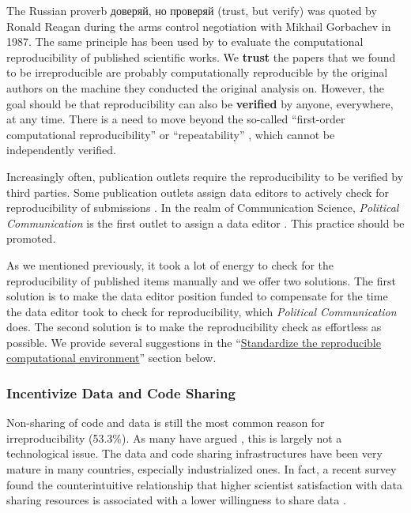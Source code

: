 The Russian proverb доверяй, но проверяй (trust, but verify) was quoted by Ronald Reagan during the arms control negotiation with Mikhail Gorbachev in 1987. The same principle has been used by \textcite{willis:2020:TV} to evaluate the computational reproducibility of published scientific works. We \textbf{trust} the papers that we found to be irreproducible are probably computationally reproducible by the original authors on the machine they conducted the original analysis on. However, the goal should be that reproducibility can also be \textbf{verified} by anyone, everywhere, at any time. There is a need to move beyond the so-called ``first-order computational reproducibility'' \parencite{schoch:2023:CRC} or ``repeatability'' \parencite{mcarthur:2019:RRR}, which cannot be independently verified.

Increasingly often, publication outlets require the reproducibility to be verified by third parties. Some publication outlets assign data editors to actively check for reproducibility of submissions \parencite[]{vilhuber2023reproducibility}. In the realm of Communication Science, \textit{Political Communication} is the first outlet to assign a data editor \parencite[]{lawrence:2022:EN}. This practice should be promoted.

As we mentioned previously, it took a lot of energy to check for the reproducibility of published items manually and we offer two solutions. The first solution is to make the data editor position funded to compensate for the time the data editor took to check for reproducibility, which \textit{Political Communication} does. The second solution is to make the reproducibility check as effortless as possible. We provide several suggestions in the ``\hyperref[subsubsec:compenviron]{Standardize the reproducible computational environment}'' section below.

\subsubsection{Incentivize Data and Code Sharing}

Non-sharing of code and data is still the most common reason for irreproducibility (53.3\%). As many have argued \parencite[e.g.][]{rowhani-farid:2017:W, panhuis:2014}, this is largely not a technological issue. The data and code sharing infrastructures have been very mature in many countries, especially industrialized ones. In fact, a recent survey found the counterintuitive relationship that higher scientist satisfaction with data sharing resources is associated with a lower willingness to share data \parencite[]{borycz:2023:P}.

